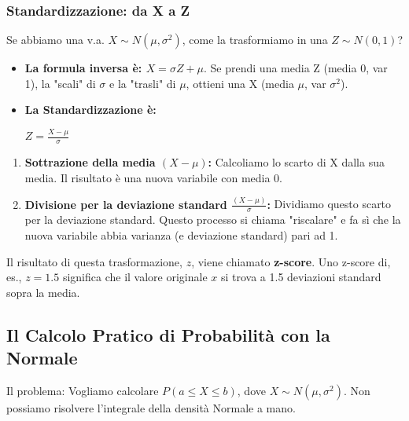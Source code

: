 \documentclass[a4paper, 11pt]{article}
\theoremstyle{definition}
\begin{document}
\subsubsection{Standardizzazione: da X a Z}
Se abbiamo una v.a. $X \sim N(\mu, \sigma^2)$, come la trasformiamo in una $Z \sim N(0,1)$?

\begin{itemize}
    \item \textbf{La formula inversa è: $X = \sigma Z + \mu$}. Se prendi una media Z (media 0, var 1), la "scali" di $\sigma$ e la "trasli" di $\mu$, ottieni una X (media $\mu$, var $\sigma^2$).

    \item \textbf{La Standardizzazione è:}
    \begin{formulabox}
        $Z = \frac{X-\mu}{\sigma}$
    \end{formulabox}
\end{itemize}
\begin{enumerate}
    \item \textbf{Sottrazione della media $(X-\mu)$:} Calcoliamo lo scarto di X dalla sua media. Il risultato è una nuova variabile con media 0.
    \item \textbf{Divisione per la deviazione standard $\frac{(X-\mu)}{\sigma}$:} Dividiamo questo scarto per la deviazione standard. Questo processo si chiama "riscalare" e fa sì che la nuova variabile abbia varianza (e deviazione standard) pari ad 1.
\end{enumerate}
Il risultato di questa trasformazione, $z$, viene chiamato \textbf{z-score}. Uno z-score di, es., $z=1.5$ significa che il valore originale $x$ si trova a 1.5 deviazioni standard sopra la media.
\subsection{Il Calcolo Pratico di Probabilità con la Normale}
Il problema: Vogliamo calcolare $P(a \le X \le b)$, dove $X \sim N(\mu, \sigma^2)$. Non possiamo risolvere l'integrale della densità Normale a mano.
\end{document}
